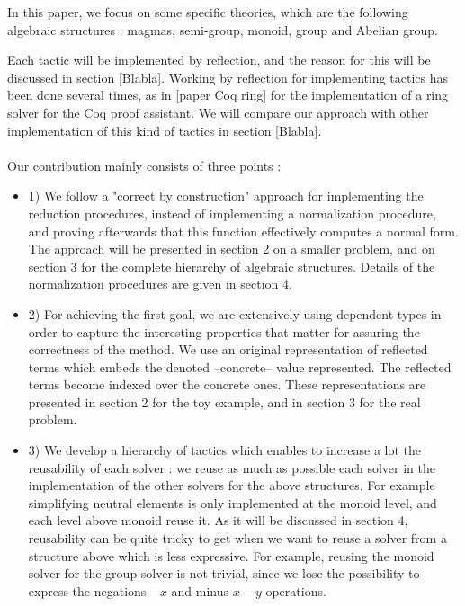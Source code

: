 In this paper, we focus on some specific theories, which are the following algebraic structures : magmas, semi-group, monoid, group and Abelian group.

Each tactic will be implemented by reflection, and the reason for this will be discussed in section [Blabla]. Working by reflection for implementing tactics has been done several times, as in [paper Coq ring] for the implementation of a ring solver for the Coq proof assistant. We will compare our approach with other implementation of this kind of tactics in section [Blabla]. \\
\\
Our contribution mainly consists of three points :
\begin{itemize}
	\item 1) We follow a "correct by construction" approach for implementing the reduction procedures, instead of implementing a normalization procedure, and proving afterwards that this function effectively computes a normal form. The approach will be presented in section 2 on a smaller problem, and on section 3 for the complete hierarchy of algebraic structures. Details of the normalization procedures are given in section 4.
	\item 2) For achieving the first goal, we are extensively using dependent types in order to capture the interesting properties that matter for assuring the correctness of the method. We use an original representation of reflected terms which embeds the denoted --concrete-- value represented. The reflected terms become indexed over the concrete ones. These representations are presented in section 2 for the toy example, and in section 3 for the real problem.
	\item 3) We develop a hierarchy of tactics which enables to increase a lot the reusability of each solver : we reuse as much as possible each solver in the implementation of the other solvers for the above structures. For example simplifying neutral elements is only implemented at the monoid level, and each level above monoid reuse it. As it will be discussed in section 4, reusability can be quite tricky to get when we want to reuse a solver from a structure above which is less expressive. For example, reusing the monoid solver for the group solver is not trivial, since we lose the possibility to express the negations $-x$ and minus $x-y$ operations.
\end{itemize}
